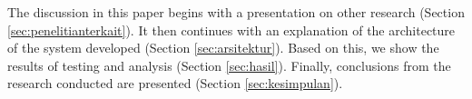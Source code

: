 The discussion in this paper begins with a presentation on other research (Section \ref{sec:penelitianterkait}). It then continues with an explanation of the architecture of the system developed (Section \ref{sec:arsitektur}). Based on this, we show the results of testing and analysis (Section \ref{sec:hasil}). Finally, conclusions from the research conducted are presented (Section \ref{sec:kesimpulan}).







